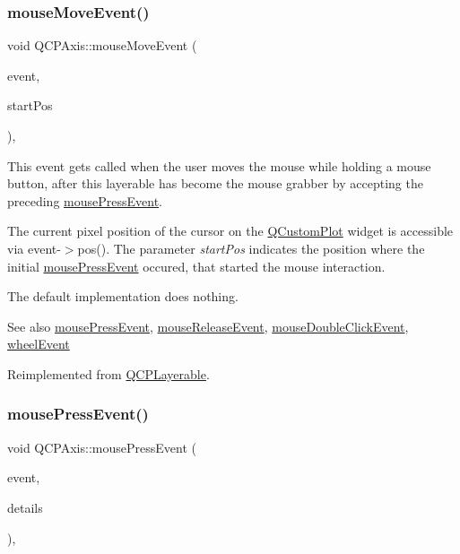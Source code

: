 \subsubsection{\texorpdfstring{mouseMoveEvent()}{mouseMoveEvent()}}
{\footnotesize\ttfamily void Q\+C\+P\+Axis\+::mouse\+Move\+Event (\begin{DoxyParamCaption}\item[{Q\+Mouse\+Event $\ast$}]{event,  }\item[{const Q\+PointF \&}]{start\+Pos }\end{DoxyParamCaption})\hspace{0.3cm}{\ttfamily [protected]}, {\ttfamily [virtual]}}

This event gets called when the user moves the mouse while holding a mouse button, after this layerable has become the mouse grabber by accepting the preceding \mbox{\hyperlink{class_q_c_p_axis_a61bc07cda6193a3fa6b5aa198fc4e4fa}{mouse\+Press\+Event}}.

The current pixel position of the cursor on the \mbox{\hyperlink{class_q_custom_plot}{Q\+Custom\+Plot}} widget is accessible via {\ttfamily event-\/$>$pos()}. The parameter {\itshape start\+Pos} indicates the position where the initial \mbox{\hyperlink{class_q_c_p_axis_a61bc07cda6193a3fa6b5aa198fc4e4fa}{mouse\+Press\+Event}} occured, that started the mouse interaction.

The default implementation does nothing.

\begin{DoxySeeAlso}{See also}
\mbox{\hyperlink{class_q_c_p_axis_a61bc07cda6193a3fa6b5aa198fc4e4fa}{mouse\+Press\+Event}}, \mbox{\hyperlink{class_q_c_p_axis_a780bee321fc6476e5fc49c4980291a01}{mouse\+Release\+Event}}, \mbox{\hyperlink{class_q_c_p_layerable_a4171e2e823aca242dd0279f00ed2de81}{mouse\+Double\+Click\+Event}}, \mbox{\hyperlink{class_q_c_p_axis_aa850f195d7cc470c53809d0fff5e444d}{wheel\+Event}} 
\end{DoxySeeAlso}


Reimplemented from \mbox{\hyperlink{class_q_c_p_layerable_a9eee1ba47fd69be111059ca3881933e4}{Q\+C\+P\+Layerable}}.

\mbox{\label{class_q_c_p_axis_a61bc07cda6193a3fa6b5aa198fc4e4fa}} 
\subsubsection{\texorpdfstring{mousePressEvent()}{mousePressEvent()}}
{\footnotesize\ttfamily void Q\+C\+P\+Axis\+::mouse\+Press\+Event (\begin{DoxyParamCaption}\item[{Q\+Mouse\+Event $\ast$}]{event,  }\item[{const Q\+Variant \&}]{details }\end{DoxyParamCaption})\hspace{0.3cm}{\ttfamily [protected]}, {\ttfamily [virtual]}}


